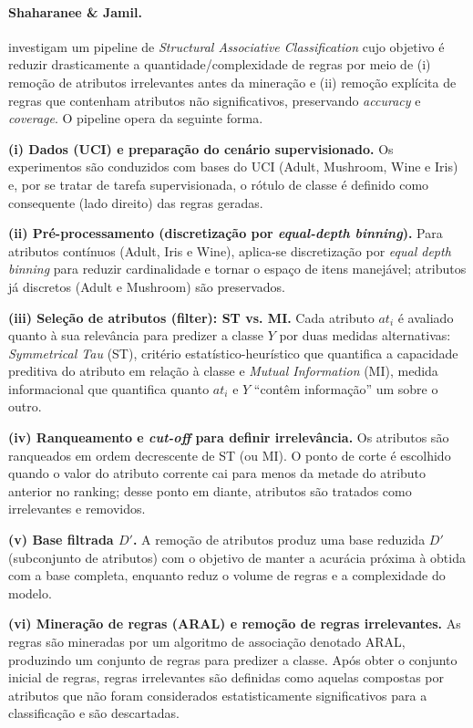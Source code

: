 \paragraph*{Shaharanee \& Jamil.} 

 investigam um pipeline de \textit{Structural Associative Classification} cujo objetivo é reduzir drasticamente a quantidade/complexidade de regras por meio de (i) remoção de atributos irrelevantes antes da mineração e (ii) remoção explícita de regras que contenham atributos não significativos, preservando \textit{accuracy} e \textit{coverage}. O pipeline opera da seguinte forma.

\textbf{(i) Dados (UCI) e preparação do cenário supervisionado.}
Os experimentos são conduzidos com bases do UCI (Adult, Mushroom, Wine e Iris) e, por se tratar de tarefa supervisionada, o rótulo de classe é definido como consequente (lado direito) das regras geradas. 

\textbf{(ii) Pré-processamento (discretização por \textit{equal-depth binning}).}
Para atributos contínuos (Adult, Iris e Wine), aplica-se discretização por \textit{equal depth binning} para reduzir cardinalidade e tornar o espaço de itens manejável; atributos já discretos (Adult e Mushroom) são preservados.

\textbf{(iii) Seleção de atributos (filter): ST vs. MI.}
Cada atributo $at_i$ é avaliado quanto à sua relevância para predizer a classe $Y$ por duas medidas alternativas: \textit{Symmetrical Tau} (ST), critério estatístico-heurístico que quantifica a capacidade preditiva do atributo em relação à classe e \textit{Mutual Information} (MI), medida informacional que quantifica quanto $at_i$ e $Y$ “contêm informação” um sobre o outro. 

\textbf{(iv) Ranqueamento e \textit{cut-off} para definir irrelevância.}
Os atributos são ranqueados em ordem decrescente de ST (ou MI). O ponto de corte é escolhido quando o valor do atributo corrente cai para menos da metade do atributo anterior no ranking; desse ponto em diante, atributos são tratados como irrelevantes e removidos. 

\textbf{(v) Base filtrada $D'$.}
A remoção de atributos produz uma base reduzida $D'$ (subconjunto de atributos) com o objetivo de manter a acurácia próxima à obtida com a base completa, enquanto reduz o volume de regras e a complexidade do modelo. 

\textbf{(vi) Mineração de regras (ARAL) e remoção de regras irrelevantes.}
As regras são mineradas por um algoritmo de associação denotado ARAL, produzindo um conjunto de regras para predizer a classe. Após obter o conjunto inicial de regras, regras irrelevantes são definidas como aquelas compostas por atributos que não foram considerados estatisticamente significativos para a classificação e são descartadas.

